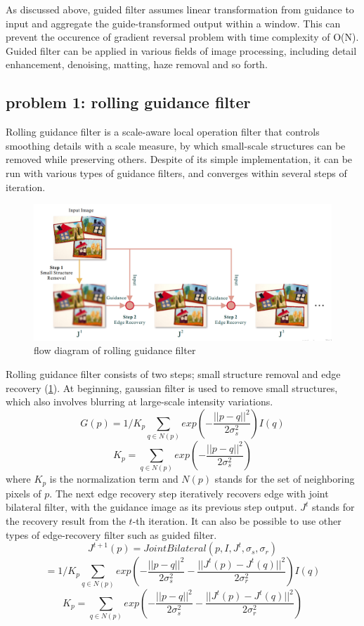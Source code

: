 \documentclass[extendedabs]{bmvc2k}
\begin{document}
As discussed above, guided filter assumes linear transformation from guidance to input 
and aggregate the guide-transformed output within a window. This can prevent the
occurence of gradient reversal problem with time complexity of O(N).
Guided filter can be applied in various fields of image processing, including detail
enhancement, denoising, matting, haze removal and so forth.

\pagebreak
\subsection*{problem 1: rolling guidance filter}

Rolling guidance filter \cite{rolling} is a scale-aware local operation filter that controls smoothing
details with a scale measure, by which small-scale structures can be removed while preserving others.
Despite of its simple implementation, it can be run with various types of guidance filters, and 
converges within several steps of iteration.

\begin{figure}[h]
    \centering
    \includegraphics[width=\linewidth]{hw2_1_6}
    \caption{flow diagram of rolling guidance filter}
    \label{fig:6}
\end{figure}

Rolling guidance filter consists of two steps; small structure removal and 
edge recovery (\figurename{\ref{fig:6}}).
At beginning, gaussian filter is used to remove small structures, which also involves blurring at
large-scale intensity variations.
\[G(p) = 1/K_p\sum_{q \in N(p)}exp(-\frac{||p-q||^2}{2\sigma_s^2})I(q)\]
\[K_p = \sum_{q \in N(p)}exp(-\frac{||p-q||^2}{2\sigma_s^2})\]
where $K_p$ is the normalization term and $N(p)$ stands for the set of neighboring pixels of $p$.
The next edge recovery step iteratively recovers edge with joint bilateral filter, with the guidance
image as its previous step output. $J^t$ stands for the recovery result from the $t$-th iteration.
It can also be possible to use other types of edge-recovery filter such as guided filter.
\[J^{t+1}(p) = JointBilateral(p, I, J^t, \sigma_s, \sigma_r)\]
\[= 1/K_p\sum_{q \in N(p)}exp(-\frac{||p-q||^2}{2\sigma_s^2}-\frac{||J^t(p)-J^t(q)||^2}{2\sigma_r^2})I(q)\]
\[K_p = \sum_{q \in N(p)}exp(-\frac{||p-q||^2}{2\sigma_s^2}-\frac{||J^t(p)-J^t(q)||^2}{2\sigma_r^2})\]
\end{document}
